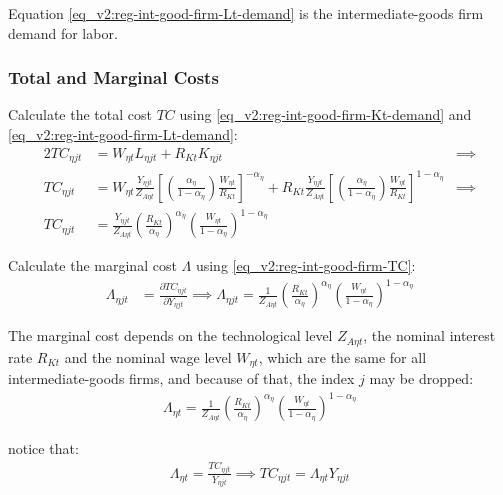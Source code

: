 \documentclass[../thesis.tex]{subfiles}
\begin{document}
Equation \ref{eq_v2:reg-int-good-firm-Lt-demand} is the intermediate-goods firm demand for labor.

\subsubsection*{Total and Marginal Costs}

Calculate the total cost $TC$ using \ref{eq_v2:reg-int-good-firm-Kt-demand} and \ref{eq_v2:reg-int-good-firm-Lt-demand}:
\begin{alignat}{2}
	TC_{\eta jt} & = W_{\eta t} L_{\eta jt} + R_{Kt} K_{\eta jt} &\implies \nonumber \\
	TC_{\eta jt} & = W_{\eta t} \frac{Y_{\eta jt}}{Z_{A\eta t}} \left[ \left( \frac{{\alpha_{\eta}}}{1-\alpha_{\eta}} \right) \frac{W_{\eta t}}{R_{Kt}} \right]^{-{\alpha_{\eta}}} + R_{Kt} \frac{Y_{\eta jt}}{Z_{A\eta t}} \left[ \left( \frac{{\alpha_{\eta}}}{1-\alpha_{\eta}} \right) \frac{W_{\eta t}}{R_{Kt}} \right]^{1-\alpha_{\eta}} &\implies \nonumber \\
	TC_{\eta jt} & = \frac{Y_{\eta jt}}{Z_{A\eta t}} \left( \frac{R_{Kt}}{{\alpha_{\eta}}} \right)^{{\alpha_{\eta}}} \left( \frac{W_{\eta t}}{1-\alpha_{\eta}} \right)^{1-\alpha_{\eta}} \label{eq_v2:reg-int-good-firm-TC}
\end{alignat}


Calculate the marginal cost $\Lambda$ using \ref{eq_v2:reg-int-good-firm-TC}: 
\begin{align}
	\Lambda_{\eta jt} & = \frac{\partial TC_{\eta jt}}{\partial Y_{\eta jt}} \implies 
	\Lambda_{\eta jt} = \frac{1}{Z_{A\eta t}} \left( \frac{R_{Kt}}{{\alpha_{\eta}}} \right)^{{\alpha_{\eta}}} \left( \frac{W_{\eta t}}{1-\alpha_{\eta}} \right)^{1-\alpha_{\eta}} \label{eq_v2:reg-int-good-firm-MC}
\end{align}

The marginal cost depends on the technological level $Z_{A\eta t}$, the nominal interest rate $R_{Kt}$ and the nominal wage level $W_{\eta t}$, which are the same for all intermediate-goods firms, and because of that, the index $j$ may be dropped:
\begin{align}
	\label{eq_v2:reg-int-good-firm-MC-2}
	\Lambda_{\eta t} = \frac{1}{Z_{A\eta t}} \left( \frac{R_{Kt}}{{\alpha_{\eta}}} \right)^{{\alpha_{\eta}}} \left( \frac{W_{\eta t}}{1-\alpha_{\eta}} \right)^{1-\alpha_{\eta}}
\end{align}

notice that:
\begin{align}
	\Lambda_{\eta t} = \frac{TC_{\eta jt}}{Y_{\eta jt}} \implies 
	TC_{\eta jt} = \Lambda_{\eta t} Y_{\eta jt} \label{eq_v2:reg-int-good-firm-TC-MC}
\end{align}
\end{document}
